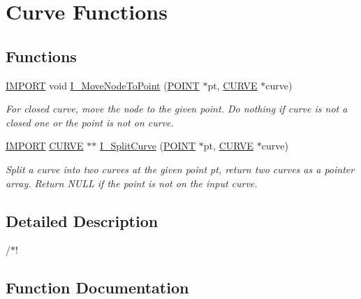 \hypertarget{group___c_u_r_v_e}{}\section{Curve Functions}
\label{group___c_u_r_v_e}
\subsection*{Functions}
\begin{DoxyCompactItemize}
\item 
\hyperlink{cdecs_8h_a773175d74e73776d69c3e538f17de1ee}{I\+M\+P\+O\+RT} void \hyperlink{group___c_u_r_v_e_gaf5511b0669f7ce4f454eb2d266327c06}{I\+\_\+\+Move\+Node\+To\+Point} (\hyperlink{int_8h_a3a87c5c9d0146e30a4bf720f701e5a63}{P\+O\+I\+NT} $\ast$pt, \hyperlink{int_8h_a4c1c272bef898dbaa20b055af85cd685}{C\+U\+R\+VE} $\ast$curve)
\begin{DoxyCompactList}\small\item\em For closed curve, move the node to the given point. Do nothing if curve is not a closed one or the point is not on curve. \end{DoxyCompactList}\item 
\hyperlink{cdecs_8h_a773175d74e73776d69c3e538f17de1ee}{I\+M\+P\+O\+RT} \hyperlink{int_8h_a4c1c272bef898dbaa20b055af85cd685}{C\+U\+R\+VE} $\ast$$\ast$ \hyperlink{group___c_u_r_v_e_gaa31257a485f0828bb60bfef19eeaec49}{I\+\_\+\+Split\+Curve} (\hyperlink{int_8h_a3a87c5c9d0146e30a4bf720f701e5a63}{P\+O\+I\+NT} $\ast$pt, \hyperlink{int_8h_a4c1c272bef898dbaa20b055af85cd685}{C\+U\+R\+VE} $\ast$curve)
\begin{DoxyCompactList}\small\item\em Split a curve into two curves at the given point pt, return two curves as a pointer array. Return N\+U\+LL if the point is not on the input curve. \end{DoxyCompactList}\end{DoxyCompactItemize}


\subsection{Detailed Description}
/$\ast$! 

\subsection{Function Documentation}
